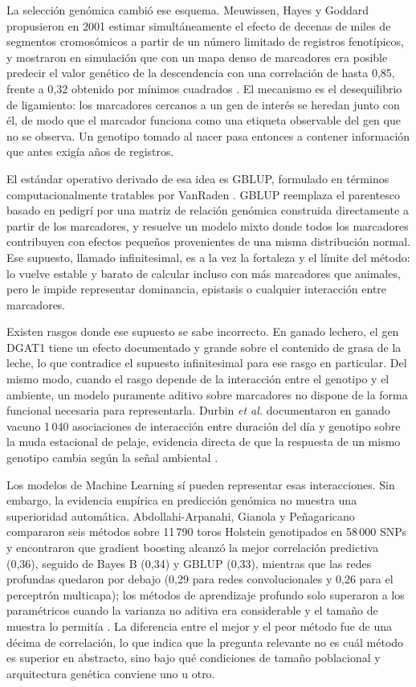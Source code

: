\documentclass[conference]{IEEEtran}
\begin{document}
La selección genómica cambió ese esquema. Meuwissen, Hayes y Goddard
propusieron en 2001 estimar simultáneamente el efecto de decenas de miles
de segmentos cromosómicos a partir de un número limitado de registros
fenotípicos, y mostraron en simulación que con un mapa denso de
marcadores era posible predecir el valor genético de la descendencia con
una correlación de hasta 0{,}85, frente a 0{,}32 obtenido por mínimos
cuadrados \cite{meuwissen2001}. El mecanismo es el desequilibrio de
ligamiento: los marcadores cercanos a un gen de interés se heredan junto
con él, de modo que el marcador funciona como una etiqueta observable del
gen que no se observa. Un genotipo tomado al nacer pasa entonces a
contener información que antes exigía años de registros.

El estándar operativo derivado de esa idea es GBLUP, formulado en
términos computacionalmente tratables por VanRaden \cite{vanraden2008}.
GBLUP reemplaza el parentesco basado en pedigrí por una matriz de
relación genómica construida directamente a partir de los marcadores, y
resuelve un modelo mixto donde todos los marcadores contribuyen con
efectos pequeños provenientes de una misma distribución normal. Ese
supuesto, llamado infinitesimal, es a la vez la fortaleza y el límite del
método: lo vuelve estable y barato de calcular incluso con más marcadores
que animales, pero le impide representar dominancia, epistasis o
cualquier interacción entre marcadores.

Existen rasgos donde ese supuesto se sabe incorrecto. En ganado lechero,
el gen DGAT1 tiene un efecto documentado y grande sobre el contenido de
grasa de la leche, lo que contradice el supuesto infinitesimal para ese
rasgo en particular. Del mismo modo, cuando el rasgo depende de la
interacción entre el genotipo y el ambiente, un modelo puramente aditivo
sobre marcadores no dispone de la forma funcional necesaria para
representarla. Durbin \textit{et al.} documentaron en ganado vacuno
1\,040 asociaciones de interacción entre duración del día y genotipo
sobre la muda estacional de pelaje, evidencia directa de que la respuesta
de un mismo genotipo cambia según la señal ambiental \cite{durbin2024}.

Los modelos de Machine Learning sí pueden representar esas
interacciones. Sin embargo, la evidencia empírica en predicción genómica
no muestra una superioridad automática. Abdollahi-Arpanahi, Gianola y
Peñagaricano compararon seis métodos sobre 11\,790 toros Holstein
genotipados en 58\,000 SNPs y encontraron que gradient boosting alcanzó
la mejor correlación predictiva (0{,}36), seguido de Bayes B (0{,}34) y
GBLUP (0{,}33), mientras que las redes profundas quedaron por debajo
(0{,}29 para redes convolucionales y 0{,}26 para el perceptrón
multicapa); los métodos de aprendizaje profundo solo superaron a los
paramétricos cuando la varianza no aditiva era considerable y el tamaño
de muestra lo permitía \cite{abdollahi2020}. La diferencia entre el mejor
y el peor método fue de una décima de correlación, lo que indica que la
pregunta relevante no es cuál método es superior en abstracto, sino bajo
qué condiciones de tamaño poblacional y arquitectura genética conviene
uno u otro.
\end{document}
